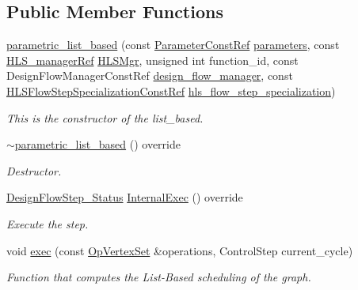 \subsection*{Public Member Functions}
\begin{DoxyCompactItemize}
\item 
\hyperlink{classparametric__list__based_a10067b837be6ed6afd89010346ec51d3}{parametric\+\_\+list\+\_\+based} (const \hyperlink{Parameter_8hpp_a37841774a6fcb479b597fdf8955eb4ea}{Parameter\+Const\+Ref} \hyperlink{classDesignFlowStep_a802eaafe8013df706370679d1a436949}{parameters}, const \hyperlink{hls__manager_8hpp_acd3842b8589fe52c08fc0b2fcc813bfe}{H\+L\+S\+\_\+manager\+Ref} \hyperlink{classHLS__step_ade85003a99d34134418451ddc46a18e9}{H\+L\+S\+Mgr}, unsigned int function\+\_\+id, const Design\+Flow\+Manager\+Const\+Ref \hyperlink{classDesignFlowStep_ab770677ddf087613add30024e16a5554}{design\+\_\+flow\+\_\+manager}, const \hyperlink{hls__step_8hpp_a5fdd2edf290c196531d21d68e13f0e74}{H\+L\+S\+Flow\+Step\+Specialization\+Const\+Ref} \hyperlink{classHLS__step_a843be75ba53b81876aa3c8b870ae8a55}{hls\+\_\+flow\+\_\+step\+\_\+specialization})
\begin{DoxyCompactList}\small\item\em This is the constructor of the list\+\_\+based. \end{DoxyCompactList}\item 
\hyperlink{classparametric__list__based_a088790da3c76d207bee5fb68b4fecea0}{$\sim$parametric\+\_\+list\+\_\+based} () override
\begin{DoxyCompactList}\small\item\em Destructor. \end{DoxyCompactList}\item 
\hyperlink{design__flow__step_8hpp_afb1f0d73069c26076b8d31dbc8ebecdf}{Design\+Flow\+Step\+\_\+\+Status} \hyperlink{classparametric__list__based_a15e5fa8f17cfb775d16ab6d541c7822a}{Internal\+Exec} () override
\begin{DoxyCompactList}\small\item\em Execute the step. \end{DoxyCompactList}\item 
void \hyperlink{classparametric__list__based_abc6a741625056fc292a4ef5e58297ad4}{exec} (const \hyperlink{classOpVertexSet}{Op\+Vertex\+Set} \&operations, Control\+Step current\+\_\+cycle)
\begin{DoxyCompactList}\small\item\em Function that computes the List-\/\+Based scheduling of the graph. \end{DoxyCompactList}\item 

\end{DoxyCompactItemize}
